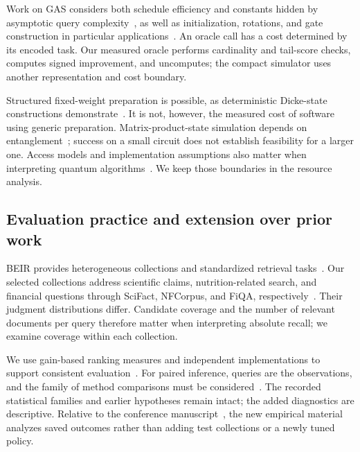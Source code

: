 Work on GAS considers both schedule efficiency and constants hidden by asymptotic query complexity~\cite{ominato2024gas}, as well as initialization, rotations, and gate construction in particular applications~\cite{norimoto2024gas}. An oracle call has a cost determined by its encoded task. Our measured oracle performs cardinality and tail-score checks, computes signed improvement, and uncomputes; the compact simulator uses another representation and cost boundary.

Structured fixed-weight preparation is possible, as deterministic Dicke-state constructions demonstrate~\cite{bartschi2019dicke}. It is not, however, the measured cost of software using generic preparation. Matrix-product-state simulation depends on entanglement~\cite{vidal2003simulation}; success on a small circuit does not establish feasibility for a larger one. Access models and implementation assumptions also matter when interpreting quantum algorithms~\cite{montanaro2016quantum}. We keep those boundaries in the resource analysis.

\subsection{Evaluation practice and extension over prior work}
BEIR provides heterogeneous collections and standardized retrieval tasks~\cite{thakur2021beir}. Our selected collections address scientific claims, nutrition-related search, and financial questions through SciFact, NFCorpus, and FiQA, respectively~\cite{wadden2020scifact,boteva2016nfcorpus,maia2018fiqa}. Their judgment distributions differ. Candidate coverage and the number of relevant documents per query therefore matter when interpreting absolute recall; we examine coverage within each collection.

We use gain-based ranking measures and independent implementations to support consistent evaluation~\cite{jarvelin2002gain,trec_eval}. For paired inference, queries are the observations, and the family of method comparisons must be considered~\cite{smucker2007tests,holm1979multiple,dror2018harnessing}. The recorded statistical families and earlier hypotheses remain intact; the added diagnostics are descriptive. Relative to the conference manuscript~\cite{conference2026}, the new empirical material analyzes saved outcomes rather than adding test collections or a newly tuned policy.

